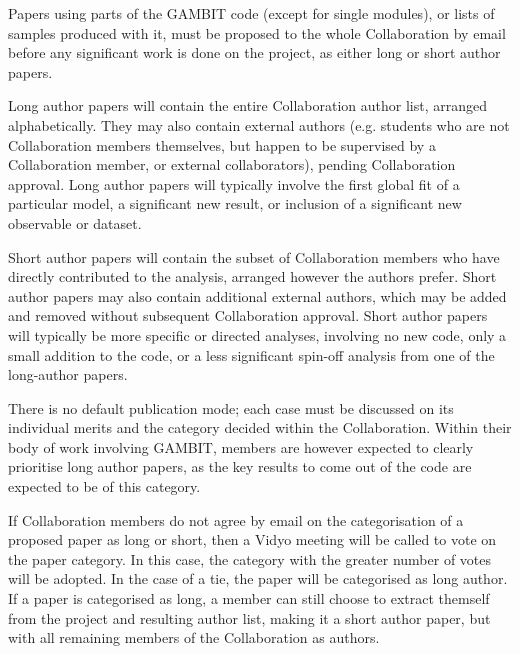 Papers using parts of the GAMBIT code (except for single modules), or lists of samples produced with it, must be proposed to the whole Collaboration by email before any significant work is done on the project, as either long or short author papers.  

Long author papers will contain the entire Collaboration author list, arranged alphabetically.  They may also contain external authors (e.g. students who are not Collaboration members themselves, but happen to be supervised by a Collaboration member, or external collaborators), pending Collaboration approval.  Long author papers will typically involve the first global fit of a particular model, a significant new result, or inclusion of a significant new observable or dataset.

Short author papers will contain the subset of Collaboration members who have directly contributed to the analysis, arranged however the authors prefer.  Short author papers may also contain additional external authors, which may be added and removed without subsequent Collaboration approval.  Short author papers will typically be more specific or directed analyses, involving no new code, only a small addition to the code, or a less significant spin-off analysis from one of the long-author papers.

There is no default publication mode; each case must be discussed on its individual merits and the category decided within the Collaboration.  Within their body of work involving GAMBIT, members are however expected to clearly prioritise long author papers, as the key results to come out of the code are expected to be of this category.

If Collaboration members do not agree by email on the categorisation of a proposed paper as long or short, then a Vidyo meeting will be called to vote on the paper category.  In this case, the category with the greater number of votes will be adopted.  In the case of a tie, the paper will be categorised as long author.  If a paper is categorised as long, a member can still choose to extract themself from the project and resulting author list, making it a short author paper, but with all remaining members of the Collaboration as authors.

